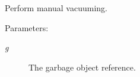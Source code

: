 Perform manual vacuuming. 

\begin{Desc}
\item[Parameters:]
\begin{description}
\item[{\em g}]The garbage object reference. \end{description}
\end{Desc}

